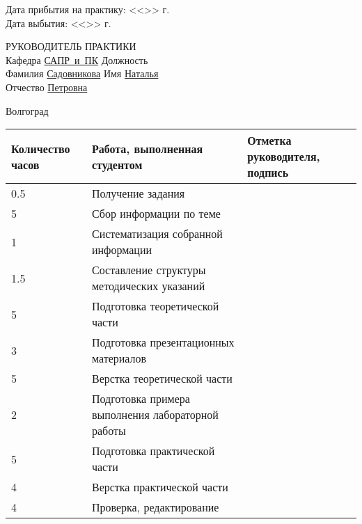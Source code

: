 \documentclass[a4paper, 14pt]{extreport}
\begin{document}
\begin{titlepage}
\begin{flushleft}
            Дата прибытия на практику: <<\underline{\hspace{1cm}}>> \underline{\hspace{3cm}} 
            \the\year г.\\
            Дата выбытия: \hspace{3cm}<<\underline{\hspace{1cm}}>> \underline{\hspace{3cm}} 
            \the\year г.
        \end{flushleft}
        \vspace{2cm}
        \begin{flushleft}
            РУКОВОДИТЕЛЬ ПРАКТИКИ\\
            Кафедра \underline{САПР~и~ПК\hspace{2.4cm}} Должность \underline{\hspace{5cm}} \\
            Фамилия \underline{Садовникова\hspace{2.1cm}} Имя \underline{Наталья\hspace{5.5cm}}\\
            Отчество \underline{Петровна\hspace{2.8cm}}
        \end{flushleft}
        \vspace{\fill}
        \begin{center}
            Волгоград \the\year
        \end{center}
    \end{titlepage}
    \begin{table}[h!]
        \centering
        \begin{tabular}{|m{}|m{}|m{}|}
            \hline
            Количество часов & Работа, выполненная студентом & Отметка
            руководителя, подпись \\ \hline
            0.5 & Получение задания & \\ \hline
            5 & Сбор информации по теме & \\ \hline
            1 & Систематизация собранной информации & \\ \hline
            1.5 & Составление структуры методических указаний & \\ \hline
            5 & Подготовка теоретической части & \\ \hline
            3 & Подготовка презентационных материалов & \\ \hline
            5 & Верстка теоретической части & \\ \hline
            2 & Подготовка примера выполнения лабораторной работы & \\ \hline
            5 & Подготовка практической части & \\ \hline
            4 & Верстка практической части & \\ \hline
            4 & Проверка, редактирование & \\ \hline
        \end{tabular}
    \end{table}
\end{document}
